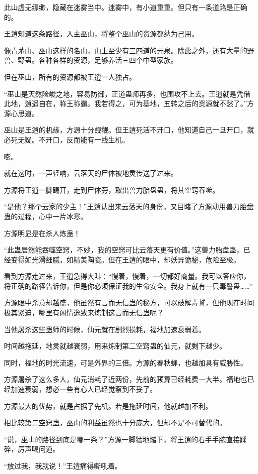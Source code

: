 \begin{this_body}
此山虚无缥缈，隐藏在迷雾当中。迷雾中，有小道重重。但只有一条道路是正确的。

王逍知道这条路径，入主巫山，将整个巫山的资源都纳为己用。

像青茅山、巫山这样的名山，山上至少有三四道的元泉。除此之外，还有大量的野兽、野蛊。各种各样的资源，足够养活三四个中型家族。

但在巫山，所有的资源都被王逍一人独占。

“巫山是天然险峻之地，容易防御，正道蛊师再多，也围攻不上去。王逍就是凭借此地，逍遥自在，称王称霸。我若得之，可为基地，五转之后的资源就不愁了。”方源心思道。

巫山是王逍的机缘，方源十分觊觎。但王逍死活不开口，他知道自己一旦开口，就必死无疑。不开口，反而能有一线生机。

嘭。

就在这时，一声轻响，云落天的尸体被地灵传送了过来。

方源将王逍一脚踢开，走到尸体旁，取出兽力胎盘蛊，将其空窍吞噬。

“是他？那个云家的少主！”王逍认出来云落天的身份，又目睹了方源动用兽力胎盘蛊的过程，心中一片冰寒。

方源明显是在杀人炼蛊！

“此蛊居然能吞噬空窍，不妙，我的空窍可比云落天更有价值。”这兽力胎盘蛊，已经变得如光滑细腻，如精美陶瓷。但在王逍的眼中，却妖异诡秘，危险至极。

看到方源走过来，王逍急得大叫：“慢着，慢着，一切都好商量。我可以答应你，将正确的路径告诉你，但是你必须保证我的生命安全。我身上就有一只毒誓蛊……”

方源眼中杀意却越盛，他虽然有言而无信蛊的秘方，可以破解毒誓，但他现在时间极其紧迫，哪里有闲情逸致来炼制这言而无信蛊呢？

当他屠杀这些蛊师的时候，仙元就在剧烈损耗，福地加速衰弱着。

时间越拖延，地灵就越衰弱，用来炼制第二空窍蛊的仙元，就剩下越少。

同时，福地的时光流速，可是外界的三倍。方源的春秋蝉，也越加具有威胁性。

方源屠杀了这么多人，仙元消耗了近两份，先前的预算已经耗费一大半。福地也已经加速衰弱，想必一些有心人已经觉察到不妥了。

方源最大的优势，就是占据了先机。若是拖延时间，他就越加不利。

相比较第二空窍蛊，巫山的利益虽然也十分庞大，但却不是不可替代的。

“说，巫山的路径到底是哪一条？”方源一脚猛地踏下，将王逍的右手手腕直接踩碎，厉声喝问道。

“放过我，我就说！”王逍痛得嘶吼着。


\end{this_body}
